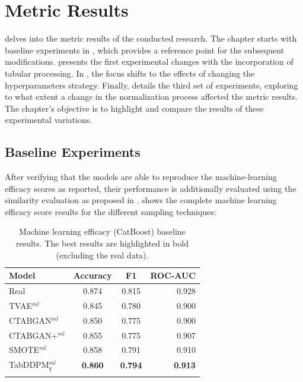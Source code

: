 \section{Metric Results}
\label{ch:results-Metric-results}

 delves into the metric results of the conducted research. 
The chapter starts with baseline experiments in , which provides a reference point for the subsequent modifications. 
 presents the first experimental changes with the incorporation of tabular processing. 
In , the focus shifts to the effects of changing the hyperparameters strategy.
Finally,  details the third set of experiments, exploring to what extent a change in the normalization process affected the metric results. 
The chapter's objective is to highlight and compare the results of these experimental variations.

\subsection{Baseline Experiments}
\label{ch:Baseline}

After verifying that the models are able to reproduce the machine-learning efficacy scores as reported,
their performance is additionally evaluated using the similarity evaluation as proposed in .
 shows the complete machine learning efficacy score results for the different sampling techniques:

\begin{table}[h]
	\centering
	\begin{tabular}{lccr}
		\toprule
		\textbf{Model}     & \textbf{Accuracy} & \textbf{F1}    & \textbf{ROC-AUC} \\
		\midrule
		Real               & 0.874              & 0.815          & 0.928            \\
		TVAE$^{ml}$        & 0.845              & 0.780          & 0.900            \\
		CTABGAN$^{ml}$     & 0.850              & 0.775          & 0.900            \\
		CTABGAN+$^{ml}$    & 0.855              & 0.775          & 0.907            \\
		SMOTE$^{ml}$       & 0.858              & 0.791          & 0.910            \\
		TabDDPM$^{ml}_{q}$ & \textbf{0.860}     & \textbf{0.794} & \textbf{0.913}   \\
		\bottomrule
		\multicolumn{4}{c}{}\\[-0.6em]
	\end{tabular}
	\caption[ML Efficacy Baseline]{Machine learning efficacy (CatBoost) baseline results. The best results are highlighted in bold (excluding the real data).}
	\label{tab:ml_baseline}
\end{table}


